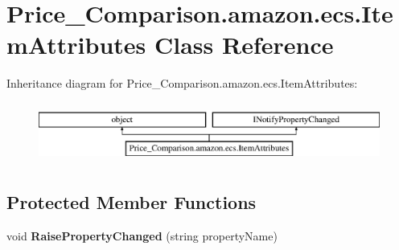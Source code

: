 \hypertarget{class_price___comparison_1_1amazon_1_1ecs_1_1_item_attributes}{\section{Price\-\_\-\-Comparison.\-amazon.\-ecs.\-Item\-Attributes Class Reference}
\label{class_price___comparison_1_1amazon_1_1ecs_1_1_item_attributes}
}


 


Inheritance diagram for Price\-\_\-\-Comparison.\-amazon.\-ecs.\-Item\-Attributes\-:\begin{figure}[H]
\begin{center}
\leavevmode
\includegraphics[height=2.000000cm]{class_price___comparison_1_1amazon_1_1ecs_1_1_item_attributes}
\end{center}
\end{figure}
\subsection*{Protected Member Functions}
\begin{DoxyCompactItemize}
\item 
\hypertarget{class_price___comparison_1_1amazon_1_1ecs_1_1_item_attributes_a930fa4853eaf0b83d14dc851d0bc4628}{void {\bfseries Raise\-Property\-Changed} (string property\-Name)}\label{class_price___comparison_1_1amazon_1_1ecs_1_1_item_attributes_a930fa4853eaf0b83d14dc851d0bc4628}

\end{DoxyCompactItemize}
